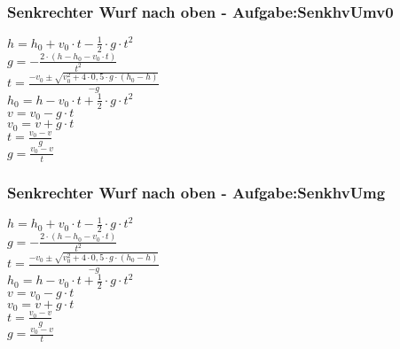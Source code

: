 \subsubsection{Senkrechter Wurf nach oben  - Aufgabe:SenkhvUmv0} 
\begin{minipage}{0.45\textwidth} 
$ h = h_{0}  + v_{0} \cdot t - \frac{1}{2}\cdot g\cdot t^{2} $\\ 
$ g = - \frac{2\cdot (h - h_{0}  - v_{0} \cdot t)}{     t^{2} } $\\ 
$ t = \frac{-v_{0}  \pm \sqrt{v_{0} ^{2} +4\cdot 0,5\cdot g\cdot (h_{0}  -h)}}{      -g} $\\ 
$ h_{0}  = h - v_{0} \cdot t + \frac{1}{2}\cdot g\cdot t^{2} $\\ 
$ v = v_{0}  - g\cdot t $\\ 
$ v_{0}  = v + g\cdot t $\\ 
$ t = \frac{v_{0} -v}{  g} $\\ 
$ g = \frac{v_{0}  - v}{  t} $\\ 
\end{minipage} 
\begin{minipage}{0.45\textwidth} 
 
\end{minipage} 
\subsubsection{Senkrechter Wurf nach oben  - Aufgabe:SenkhvUmg} 
\begin{minipage}{0.45\textwidth} 
$ h = h_{0}  + v_{0} \cdot t - \frac{1}{2}\cdot g\cdot t^{2} $\\ 
$ g = - \frac{2\cdot (h - h_{0}  - v_{0} \cdot t)}{     t^{2} } $\\ 
$ t = \frac{-v_{0}  \pm \sqrt{v_{0} ^{2} +4\cdot 0,5\cdot g\cdot (h_{0}  -h)}}{      -g} $\\ 
$ h_{0}  = h - v_{0} \cdot t + \frac{1}{2}\cdot g\cdot t^{2} $\\ 
$ v = v_{0}  - g\cdot t $\\ 
$ v_{0}  = v + g\cdot t $\\ 
$ t = \frac{v_{0} -v}{  g} $\\ 
$ g = \frac{v_{0}  - v}{  t} $\\ 
\end{minipage} 
\begin{minipage}{0.45\textwidth} 
 
\end{minipage} 
